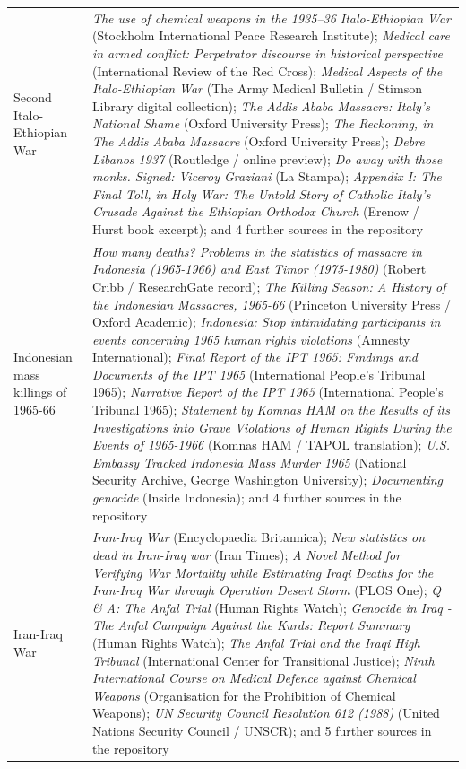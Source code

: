\documentclass[11pt]{article}
\begin{document}
\begin{scriptsize}
\begin{longtable}{p{3.5cm} p{12.5cm}}
\addlinespace
Second Italo-Ethiopian War & \emph{The use of chemical weapons in the 1935–36 Italo-Ethiopian War} (Stockholm International Peace Research Institute); \emph{Medical care in armed conflict: Perpetrator discourse in historical perspective} (International Review of the Red Cross); \emph{Medical Aspects of the Italo-Ethiopian War} (The Army Medical Bulletin / Stimson Library digital collection); \emph{The Addis Ababa Massacre: Italy's National Shame} (Oxford University Press); \emph{The Reckoning, in The Addis Ababa Massacre} (Oxford University Press); \emph{Debre Libanos 1937} (Routledge / online preview); \emph{Do away with those monks. Signed: Viceroy Graziani} (La Stampa); \emph{Appendix I: The Final Toll, in Holy War: The Untold Story of Catholic Italy's Crusade Against the Ethiopian Orthodox Church} (Erenow / Hurst book excerpt); and 4 further sources in the repository \\
\addlinespace
Indonesian mass killings of 1965-66 & \emph{How many deaths? Problems in the statistics of massacre in Indonesia (1965-1966) and East Timor (1975-1980)} (Robert Cribb / ResearchGate record); \emph{The Killing Season: A History of the Indonesian Massacres, 1965-66} (Princeton University Press / Oxford Academic); \emph{Indonesia: Stop intimidating participants in events concerning 1965 human rights violations} (Amnesty International); \emph{Final Report of the IPT 1965: Findings and Documents of the IPT 1965} (International People's Tribunal 1965); \emph{Narrative Report of the IPT 1965} (International People's Tribunal 1965); \emph{Statement by Komnas HAM on the Results of its Investigations into Grave Violations of Human Rights During the Events of 1965-1966} (Komnas HAM / TAPOL translation); \emph{U.S. Embassy Tracked Indonesia Mass Murder 1965} (National Security Archive, George Washington University); \emph{Documenting genocide} (Inside Indonesia); and 4 further sources in the repository \\
\addlinespace
Iran-Iraq War & \emph{Iran-Iraq War} (Encyclopaedia Britannica); \emph{New statistics on dead in Iran-Iraq war} (Iran Times); \emph{A Novel Method for Verifying War Mortality while Estimating Iraqi Deaths for the Iran-Iraq War through Operation Desert Storm} (PLOS One); \emph{Q \& A: The Anfal Trial} (Human Rights Watch); \emph{Genocide in Iraq - The Anfal Campaign Against the Kurds: Report Summary} (Human Rights Watch); \emph{The Anfal Trial and the Iraqi High Tribunal} (International Center for Transitional Justice); \emph{Ninth International Course on Medical Defence against Chemical Weapons} (Organisation for the Prohibition of Chemical Weapons); \emph{UN Security Council Resolution 612 (1988)} (United Nations Security Council / UNSCR); and 5 further sources in the repository \\

\end{longtable}
\end{scriptsize}
\end{document}
